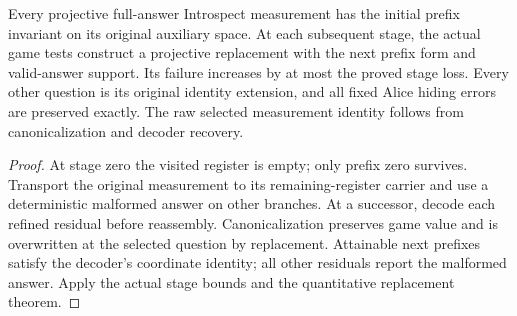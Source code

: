 \begin{lemma}
\label{lem:intro-actual-successor}
\leanok
Every projective full-answer Introspect measurement has the initial prefix
invariant on its original auxiliary space. At each subsequent stage, the
actual game tests construct a projective replacement with the next prefix
form and valid-answer support. Its failure increases by at most the proved
stage loss. Every other question is its original identity extension, and
all fixed Alice hiding errors are preserved exactly. The raw selected
measurement identity follows from canonicalization and decoder recovery.
\end{lemma}
\begin{proof}
\leanok
At stage zero the visited register is empty; only prefix zero survives.
Transport the original measurement to its remaining-register carrier and
use a deterministic malformed answer on other branches. At a successor,
decode each refined residual before reassembly. Canonicalization preserves
game value and is overwritten at the selected question by replacement.
Attainable next prefixes satisfy the decoder's coordinate identity; all
other residuals report the malformed answer. Apply the actual stage bounds
and the quantitative replacement theorem.
\end{proof}

